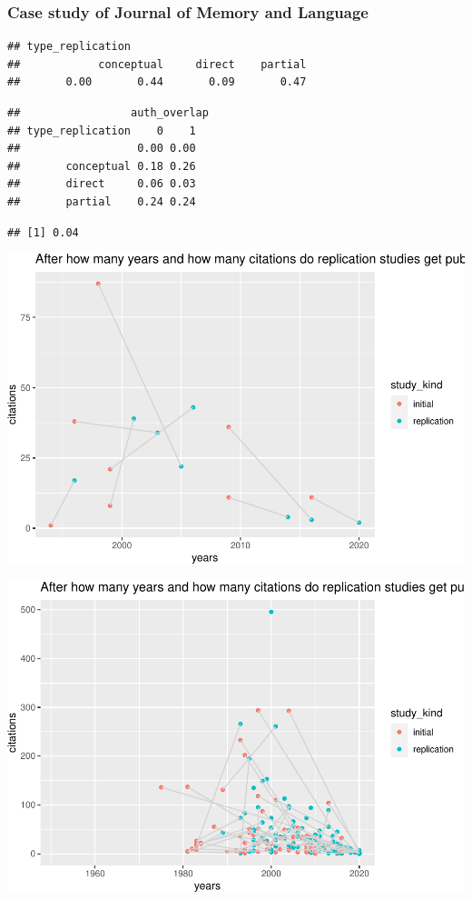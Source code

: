\documentclass[]{elsarticle} %
\begin{document}
\hypertarget{case-study-of-journal-of-memory-and-language}{%
\subsubsection{Case study of Journal of Memory and
Language}\label{case-study-of-journal-of-memory-and-language}}

\begin{verbatim}
## type_replication
##            conceptual     direct    partial 
##       0.00       0.44       0.09       0.47
\end{verbatim}

\begin{verbatim}
##                 auth_overlap
## type_replication    0    1
##                  0.00 0.00
##       conceptual 0.18 0.26
##       direct     0.06 0.03
##       partial    0.24 0.24
\end{verbatim}

\begin{verbatim}
## [1] 0.04
\end{verbatim}

\includegraphics{ReplicationLing_files/figure-latex/plot cit and years direct-1.pdf}

\includegraphics{ReplicationLing_files/figure-latex/plot cit and years all-1.pdf}
\end{document}
